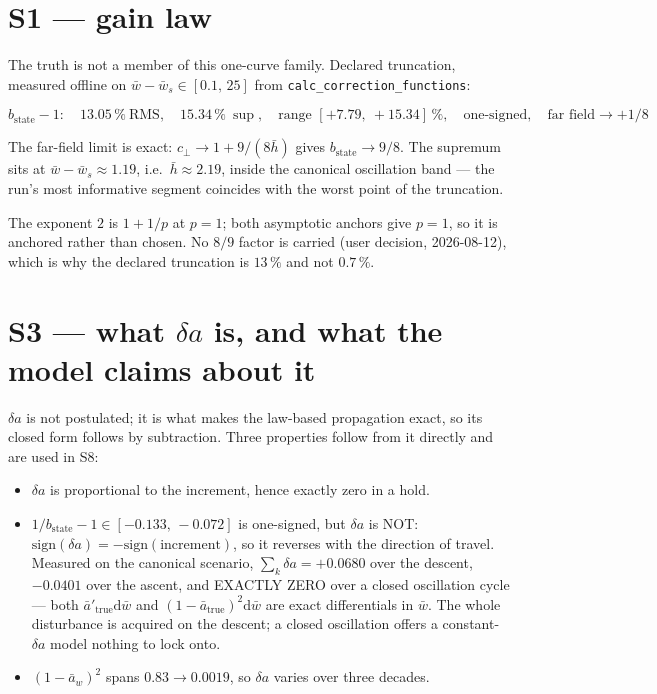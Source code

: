 \documentclass[11pt,a4paper,fontset=none]{ctexart}
\newcommand{\ba}{\bar{a}}
\newcommand{\bw}{\bar{w}}
\begin{document}
\section*{S1 --- gain law}

The truth is not a member of this one-curve family. Declared truncation,
measured offline on $\bw-\bw_s \in [0.1,\,25]$ from
\texttt{calc\_correction\_functions}:

\begin{equation*}
b_{\mathrm{state}} - 1:\quad
13.05\,\%\ \mathrm{RMS},\quad 15.34\,\%\ \sup,\quad
\text{range } [+7.79,\ +15.34]\,\%,\quad \text{one-signed},\quad
\text{far field} \to +1/8
\end{equation*}

The far-field limit is exact: $c_{\perp} \to 1 + 9/(8\bar{h})$ gives
$b_{\mathrm{state}} \to 9/8$. The supremum sits at
$\bw-\bw_s \approx 1.19$, i.e.\ $\bar{h} \approx 2.19$, inside the canonical
oscillation band --- the run's most informative segment coincides with the
worst point of the truncation.

The exponent $2$ is $1+1/p$ at $p=1$; both asymptotic anchors give $p=1$, so it
is anchored rather than chosen. No $8/9$ factor is carried (user decision,
2026-08-12), which is why the declared truncation is $13\,\%$ and not $0.7\,\%$.

\section*{S3 --- what $\delta a$ is, and what the model claims about it}

$\delta a$ is not postulated; it is what makes the law-based propagation exact,
so its closed form follows by subtraction. Three properties follow from it
directly and are used in S8:

\begin{itemize}
\item[(i)] $\delta a$ is proportional to the increment, hence exactly zero in a
hold.
\item[(ii)] $1/b_{\mathrm{state}} - 1 \in [-0.133,\,-0.072]$ is one-signed, but
$\delta a$ is NOT: $\mathrm{sign}(\delta a) = -\mathrm{sign}(\text{increment})$,
so it reverses with the direction of travel. Measured on the canonical
scenario, $\sum_k \delta a = +0.0680$ over the descent, $-0.0401$ over the
ascent, and EXACTLY ZERO over a closed oscillation cycle --- both
$\ba'_{\mathrm{true}}\mathrm{d}\bw$ and $(1-\ba_{\mathrm{true}})^{2}\mathrm{d}\bw$
are exact differentials in $\bw$. The whole disturbance is acquired on the
descent; a closed oscillation offers a constant-$\delta a$ model nothing to
lock onto.
\item[(iii)] $(1-\ba_w)^{2}$ spans $0.83 \to 0.0019$, so $\delta a$ varies over
three decades.
\end{itemize}
\end{document}
